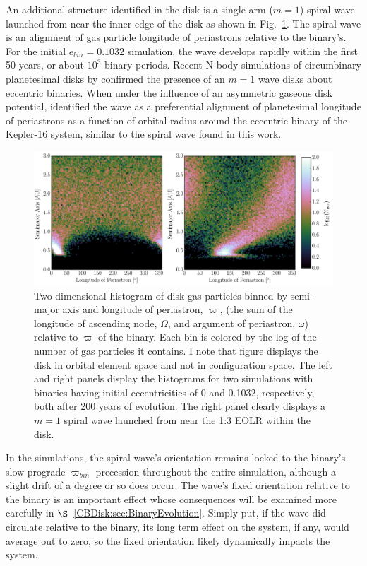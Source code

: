 An additional structure identified in the disk is a single arm ($m = 1$) spiral wave launched from near the inner edge of the disk as shown
in Fig.~\ref{fig:CBDiskDiskWave}.  The spiral wave is an alignment of gas particle longitude of periastrons relative to the binary's.  For the initial $e_{bin} = 0.1032$ simulation, the wave develops rapidly within the first 50 years, or about $10^3$ binary periods.  Recent N-body simulations of circumbinary planetesimal disks by \citet{Lines2016} confirmed the presence of an $m = 1$ wave disks about eccentric binaries.  When under the influence of an asymmetric gaseous disk potential, \citet{Lines2016} identified the wave as a preferential alignment of planetesimal longitude of periastrons as a function of orbital radius around the eccentric binary of the Kepler-16 system, similar to the spiral wave found in this work.

\begin{figure}
	\includegraphics[width=\textwidth]{f5}
    \caption{Two dimensional histogram of disk gas particles binned by semi-major axis and
longitude of periastron, $\varpi$, (the sum of the longitude of ascending node, $\Omega$, and argument of periastron, $\omega$)
relative to $\varpi$ of the binary.  Each bin is colored by the log of the number of gas particles it contains.  I note that figure displays the disk in orbital element 
space and not in configuration space.  The left and right panels display the histograms for two simulations with binaries having initial eccentricities of 0 and 
0.1032, respectively, both after 200 years of evolution.  The right panel clearly displays a $m = 1$ spiral wave launched from near the 1:3 EOLR within the disk.}
    \label{fig:CBDiskDiskWave}
\end{figure}

In the simulations, the spiral wave's orientation remains locked to
the binary's slow prograde $\varpi_{bin}$ precession throughout the
entire simulation, although a slight drift of a degree or so does
occur.  The wave's fixed orientation relative to the binary is an
important effect whose consequences will be examined more carefully in
$\S$~\ref{CBDisk:sec:BinaryEvolution}.  Simply put, if the wave did circulate
relative to the binary, its long term effect on the system, if any,
would average out to zero, so the fixed orientation likely dynamically impacts the system.


